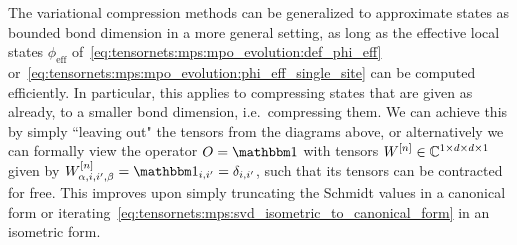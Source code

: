 The variational compression methods can be generalized to approximate states as bounded bond dimension  in a more general setting, as long as the effective local states $\phi_\text{eff}$ of~\eqref{eq:tensornets:mps:mpo_evolution:def_phi_eff} or~\eqref{eq:tensornets:mps:mpo_evolution:phi_eff_single_site} can be computed efficiently.
%
In particular, this applies to compressing states that are given as  already, to a smaller bond dimension, i.e.~compressing them.
%
We can achieve this by simply ``leaving out" the  tensors from the diagrams above, or alternatively we can formally view the operator $O = \eye$ with tensors $W^{[n]} \in \mathbb{C}^{1 \times d \times d \times 1}$ given by $W^{[n]}_{\alpha,i,i',\beta} = \eye_{i,i'} = \delta_{i,i'}$, such that its tensors can be contracted for free.
%
This improves upon simply truncating the Schmidt values in a canonical form or iterating~\eqref{eq:tensornets:mps:svd_isometric_to_canonical_form} in an isometric form.
